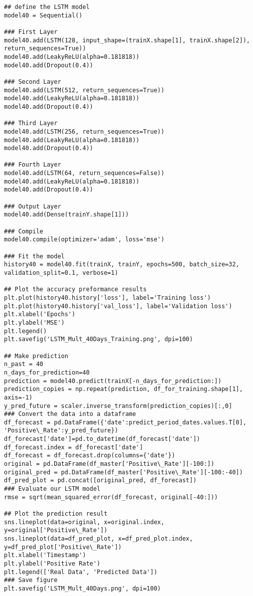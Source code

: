 \begin{appendices}
\begin{verbatim}
## define the LSTM model
model40 = Sequential()

### First Layer
model40.add(LSTM(128, input_shape=(trainX.shape[1], trainX.shape[2]), return_sequences=True))
model40.add(LeakyReLU(alpha=0.181818))
model40.add(Dropout(0.4))

### Second Layer
model40.add(LSTM(512, return_sequences=True))
model40.add(LeakyReLU(alpha=0.181818))
model40.add(Dropout(0.4))

### Third Layer
model40.add(LSTM(256, return_sequences=True))
model40.add(LeakyReLU(alpha=0.181818))
model40.add(Dropout(0.4))

### Fourth Layer
model40.add(LSTM(64, return_sequences=False))
model40.add(LeakyReLU(alpha=0.181818))
model40.add(Dropout(0.4))

### Output Layer
model40.add(Dense(trainY.shape[1]))

### Compile
model40.compile(optimizer='adam', loss='mse')

### Fit the model
history40 = model40.fit(trainX, trainY, epochs=500, batch_size=32, validation_split=0.1, verbose=1)

## Plot the accuracy preformance results
plt.plot(history40.history['loss'], label='Training loss')
plt.plot(history40.history['val_loss'], label='Validation loss')
plt.xlabel('Epochs')
plt.ylabel('MSE')
plt.legend()
plt.savefig('LSTM_Mult_40Days_Training.png', dpi=100)

## Make prediction
n_past = 40
n_days_for_prediction=40  
prediction = model40.predict(trainX[-n_days_for_prediction:])
prediction_copies = np.repeat(prediction, df_for_training.shape[1], axis=-1)
y_pred_future = scaler.inverse_transform(prediction_copies)[:,0]
### Convert the data into a dataframe
df_forecast = pd.DataFrame({'date':predict_period_dates.values.T[0], 'Positive\_Rate':y_pred_future})
df_forecast['date']=pd.to_datetime(df_forecast['date'])
df_forecast.index = df_forecast['date']
df_forecast = df_forecast.drop(columns={'date'})
original = pd.DataFrame(df_master['Positive\_Rate'][-100:])
original_pred = pd.DataFrame(df_master['Positive\_Rate'][-100:-40])
df_pred_plot = pd.concat([original_pred, df_forecast])
### Evaluate our LSTM model
rmse = sqrt(mean_squared_error(df_forecast, original[-40:]))

## Plot the prediction result
sns.lineplot(data=original, x=original.index, y=original['Positive\_Rate'])
sns.lineplot(data=df_pred_plot, x=df_pred_plot.index, y=df_pred_plot['Positive\_Rate'])
plt.xlabel('Timestamp')
plt.ylabel('Positive Rate')
plt.legend(['Real Data', 'Predicted Data'])
### Save figure
plt.savefig('LSTM_Mult_40Days.png', dpi=100)


\end{verbatim}
\end{appendices}
